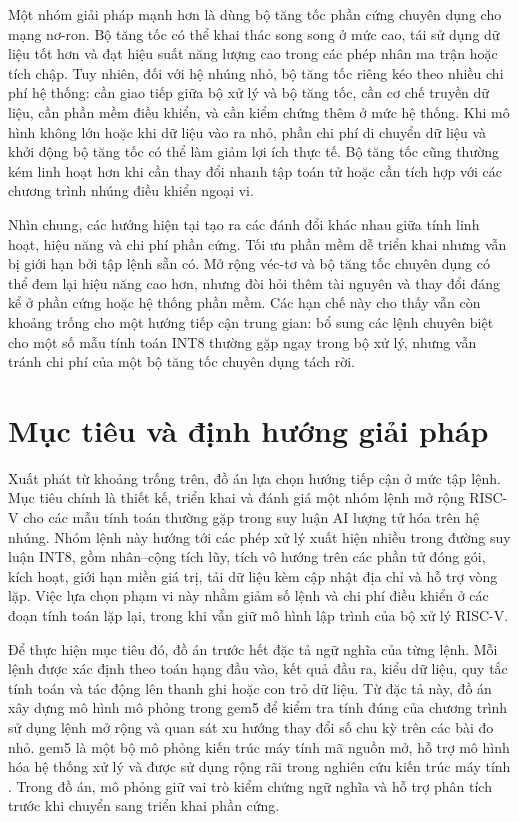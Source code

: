 \documentclass[../DoAn.tex]{subfiles}
\begin{document}
Một nhóm giải pháp mạnh hơn là dùng bộ tăng tốc phần cứng chuyên dụng cho mạng nơ-ron. Bộ tăng tốc có thể khai thác song song ở mức cao, tái sử dụng dữ liệu tốt hơn và đạt hiệu suất năng lượng cao trong các phép nhân ma trận hoặc tích chập. Tuy nhiên, đối với hệ nhúng nhỏ, bộ tăng tốc riêng kéo theo nhiều chi phí hệ thống: cần giao tiếp giữa bộ xử lý và bộ tăng tốc, cần cơ chế truyền dữ liệu, cần phần mềm điều khiển, và cần kiểm chứng thêm ở mức hệ thống. Khi mô hình không lớn hoặc khi dữ liệu vào ra nhỏ, phần chi phí di chuyển dữ liệu và khởi động bộ tăng tốc có thể làm giảm lợi ích thực tế. Bộ tăng tốc cũng thường kém linh hoạt hơn khi cần thay đổi nhanh tập toán tử hoặc cần tích hợp với các chương trình nhúng điều khiển ngoại vi.

Nhìn chung, các hướng hiện tại tạo ra các đánh đổi khác nhau giữa tính linh hoạt, hiệu năng và chi phí phần cứng. Tối ưu phần mềm dễ triển khai nhưng vẫn bị giới hạn bởi tập lệnh sẵn có. Mở rộng véc-tơ và bộ tăng tốc chuyên dụng có thể đem lại hiệu năng cao hơn, nhưng đòi hỏi thêm tài nguyên và thay đổi đáng kể ở phần cứng hoặc hệ thống phần mềm. Các hạn chế này cho thấy vẫn còn khoảng trống cho một hướng tiếp cận trung gian: bổ sung các lệnh chuyên biệt cho một số mẫu tính toán INT8 thường gặp ngay trong bộ xử lý, nhưng vẫn tránh chi phí của một bộ tăng tốc chuyên dụng tách rời.

\section{Mục tiêu và định hướng giải pháp}

Xuất phát từ khoảng trống trên, đồ án lựa chọn hướng tiếp cận ở mức tập lệnh. Mục tiêu chính là thiết kế, triển khai và đánh giá một nhóm lệnh mở rộng RISC-V cho các mẫu tính toán thường gặp trong suy luận AI lượng tử hóa trên hệ nhúng. Nhóm lệnh này hướng tới các phép xử lý xuất hiện nhiều trong đường suy luận INT8, gồm nhân--cộng tích lũy, tích vô hướng trên các phần tử đóng gói, kích hoạt, giới hạn miền giá trị, tải dữ liệu kèm cập nhật địa chỉ và hỗ trợ vòng lặp. Việc lựa chọn phạm vi này nhằm giảm số lệnh và chi phí điều khiển ở các đoạn tính toán lặp lại, trong khi vẫn giữ mô hình lập trình của bộ xử lý RISC-V.

Để thực hiện mục tiêu đó, đồ án trước hết đặc tả ngữ nghĩa của từng lệnh. Mỗi lệnh được xác định theo toán hạng đầu vào, kết quả đầu ra, kiểu dữ liệu, quy tắc tính toán và tác động lên thanh ghi hoặc con trỏ dữ liệu. Từ đặc tả này, đồ án xây dựng mô hình mô phỏng trong gem5 để kiểm tra tính đúng của chương trình sử dụng lệnh mở rộng và quan sát xu hướng thay đổi số chu kỳ trên các bài đo nhỏ. gem5 là một bộ mô phỏng kiến trúc máy tính mã nguồn mở, hỗ trợ mô hình hóa hệ thống xử lý và được sử dụng rộng rãi trong nghiên cứu kiến trúc máy tính \cite{binkert2011gem5}. Trong đồ án, mô phỏng giữ vai trò kiểm chứng ngữ nghĩa và hỗ trợ phân tích trước khi chuyển sang triển khai phần cứng.
\end{document}
